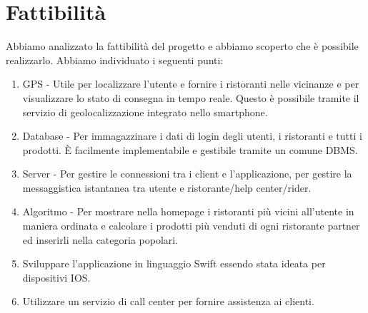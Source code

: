 \documentclass{article}
\begin{document}
\section{Fattibilità} \par\vspace{0.5cm}
\par Abbiamo analizzato la fattibilità del progetto e abbiamo scoperto che è possibile realizzarlo. Abbiamo individuato i seguenti punti: \par
\begin{enumerate}
    \item GPS - Utile per localizzare l’utente e fornire i ristoranti nelle vicinanze e per visualizzare lo stato di consegna in tempo reale. Questo è possibile tramite il servizio di geolocalizzazione integrato nello smartphone.
    \item Database - Per immagazzinare i dati di login degli utenti, i ristoranti e tutti i prodotti. È facilmente implementabile e gestibile tramite un comune DBMS.
    \item Server - Per gestire le connessioni tra i client e l’applicazione, per gestire la messaggistica istantanea tra utente e ristorante/help center/rider.
    \item Algoritmo - Per mostrare nella homepage i ristoranti più vicini all’utente in maniera ordinata e calcolare i prodotti più venduti di ogni ristorante partner ed inserirli nella categoria popolari.
    \item Sviluppare l’applicazione in linguaggio Swift essendo stata ideata per dispositivi IOS.
    \item Utilizzare un servizio di call center per fornire assistenza ai clienti.
\end{enumerate}
\end{document}
